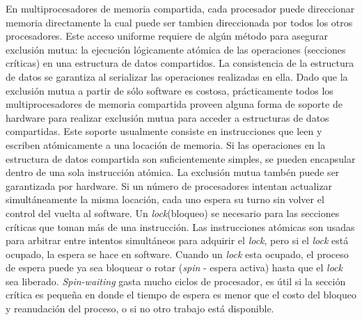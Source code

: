 En multiprocesadores de memoria compartida, cada procesador puede direccionar memoria directamente la cual puede ser tambien direccionada por todos los otros procesadores. Este acceso uniforme requiere de algún método para asegurar exclusión mutua: la ejecución lógicamente atómica de las operaciones (secciones críticas) en una estructura de datos compartidos. La consistencia de la estructura de datos se garantiza al serializar las operaciones realizadas en ella.
Dado que la exclusión mutua a partir de sólo software es costosa, prácticamente todos los multiprocesadores de memoria compartida proveen alguna forma de soporte de hardware para realizar exclusión mutua para acceder a estructuras de datos compartidas. Este soporte usualmente consiste en instrucciones que leen y escriben atómicamente a una locación de memoria. Si las operaciones en la estructura de datos compartida son suficientemente simples, se pueden encapsular dentro de una sola instrucción atómica. La exclusión mutua tambén puede ser garantizada por hardware. Si un número de procesadores intentan actualizar simultáneamente la misma locación, cada uno espera su turno sin volver el control del vuelta al software. Un \textit{lock}(bloqueo) se necesario para las secciones críticas que toman más de una instrucción. Las instrucciones atómicas son usadas para arbitrar entre intentos simultáneos para adquirir el \textit{lock}, pero si el \textit{lock} está ocupado, la espera se hace en software. Cuando un \textit{lock} esta ocupado, el proceso de espera puede ya sea bloquear o rotar (\textit{spin} - espera activa) hasta que el \textit{lock} sea liberado. \textit{Spin-waiting} gasta mucho ciclos de procesador, es útil si la sección crítica es pequeña en donde el tiempo de espera es menor que el costo del bloqueo y reanudación del proceso, o si no otro trabajo está disponible.

